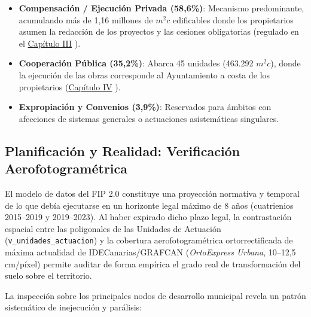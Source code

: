 \begin{table}[htbp]
  \centering
  \caption{Distribución de Unidades de Actuación según Sistema de Ejecución}
  \label{tab:resumen_sistemas}
  \vspace{0.2cm}
  
\end{table}

\begin{itemize}
  \item \textbf{Compensación / Ejecución Privada (58,6\%)}: Mecanismo predominante, acumulando más de 1,16 millones de $m^2c$ edificables donde los propietarios asumen la redacción de los proyectos y las cesiones obligatorias (regulado en el \href{https://www.boe.es/buscar/act.php?id=BOE-A-2017-10295#ci-21}{Capítulo III} \cite{ley_suelo_canarias_2017}
    ).
  \item \textbf{Cooperación Pública (35,2\%)}: Abarca 45 unidades (463.292 $m^2c$), donde la ejecución de las obras corresponde al Ayuntamiento a costa de los propietarios (\href{https://www.boe.es/buscar/act.php?id=BOE-A-2017-10295#ci-22}{Capítulo IV}
    ).
  \item \textbf{Expropiación y Convenios (3,9\%)}: Reservados para ámbitos con afecciones de sistemas generales o actuaciones asistemáticas singulares.
\end{itemize}

\subsection{Planificación y Realidad: Verificación Aerofotogramétrica}

El modelo de datos del FIP 2.0 constituye una proyección normativa y temporal de lo que debía ejecutarse en un horizonte legal máximo de 8 años (cuatrienios 2015--2019 y 2019--2023). Al haber expirado dicho plazo legal, la contrastación espacial entre las poligonales de las Unidades de Actuación (\texttt{v\_unidades\_actuacion}) y la cobertura aerofotogramétrica ortorrectificada de máxima actualidad de IDECanarias/GRAFCAN (\emph{OrtoExpress Urbana}, 10--12,5 cm/píxel) permite auditar de forma empírica el grado real de transformación del suelo sobre el territorio.

La inspección sobre los principales nodos de desarrollo municipal revela un patrón sistemático de inejecución y parálisis:


